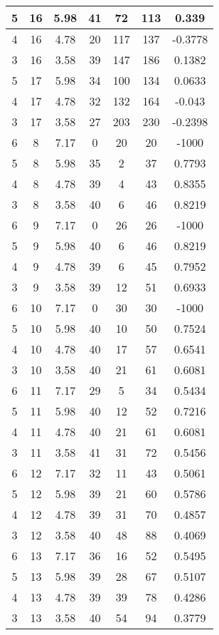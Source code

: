 \documentclass[letterpaper, 12pt]{article}
\begin{document}
\begin{longtable}{|c|c|c|c|c|c|c|}
\hline
5 & 16 & 5.98 & 41 & 72 & 113 & 0.339 \\
\hline
4 & 16 & 4.78 & 20 & 117 & 137 & -0.3778 \\
\hline
3 & 16 & 3.58 & 39 & 147 & 186 & 0.1382 \\
\hline
5 & 17 & 5.98 & 34 & 100 & 134 & 0.0633 \\
\hline
4 & 17 & 4.78 & 32 & 132 & 164 & -0.043 \\
\hline
3 & 17 & 3.58 & 27 & 203 & 230 & -0.2398 \\
\hline
6 & 8 & 7.17 & 0 & 20 & 20 & -1000 \\
\hline
5 & 8 & 5.98 & 35 & 2 & 37 & 0.7793 \\
\hline
4 & 8 & 4.78 & 39 & 4 & 43 & 0.8355 \\
\hline
3 & 8 & 3.58 & 40 & 6 & 46 & 0.8219 \\
\hline
6 & 9 & 7.17 & 0 & 26 & 26 & -1000 \\
\hline
5 & 9 & 5.98 & 40 & 6 & 46 & 0.8219 \\
\hline
4 & 9 & 4.78 & 39 & 6 & 45 & 0.7952 \\
\hline
3 & 9 & 3.58 & 39 & 12 & 51 & 0.6933 \\
\hline
6 & 10 & 7.17 & 0 & 30 & 30 & -1000 \\
\hline
5 & 10 & 5.98 & 40 & 10 & 50 & 0.7524 \\
\hline
4 & 10 & 4.78 & 40 & 17 & 57 & 0.6541 \\
\hline
3 & 10 & 3.58 & 40 & 21 & 61 & 0.6081 \\
\hline
6 & 11 & 7.17 & 29 & 5 & 34 & 0.5434 \\
\hline
5 & 11 & 5.98 & 40 & 12 & 52 & 0.7216 \\
\hline
4 & 11 & 4.78 & 40 & 21 & 61 & 0.6081 \\
\hline
3 & 11 & 3.58 & 41 & 31 & 72 & 0.5456 \\
\hline
6 & 12 & 7.17 & 32 & 11 & 43 & 0.5061 \\
\hline
5 & 12 & 5.98 & 39 & 21 & 60 & 0.5786 \\
\hline
4 & 12 & 4.78 & 39 & 31 & 70 & 0.4857 \\
\hline
3 & 12 & 3.58 & 40 & 48 & 88 & 0.4069 \\
\hline
6 & 13 & 7.17 & 36 & 16 & 52 & 0.5495 \\
\hline
5 & 13 & 5.98 & 39 & 28 & 67 & 0.5107 \\
\hline
4 & 13 & 4.78 & 39 & 39 & 78 & 0.4286 \\
\hline
3 & 13 & 3.58 & 40 & 54 & 94 & 0.3779 \\

\end{longtable}
\end{document}
